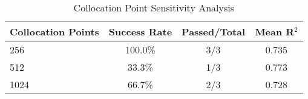 
\begin{table}[htbp]
\centering
\caption{Collocation Point Sensitivity Analysis}
\label{tab:exp3_collocation}
\begin{tabular}{lccc}
\hline
\textbf{Collocation Points} & \textbf{Success Rate} & \textbf{Passed/Total} & \textbf{Mean R$^2$} \\
\hline
256 & 100.0\% & 3/3 & 0.735 \\
512 & 33.3\% & 1/3 & 0.773 \\
1024 & 66.7\% & 2/3 & 0.728 \\
\hline
\end{tabular}
\end{table}
